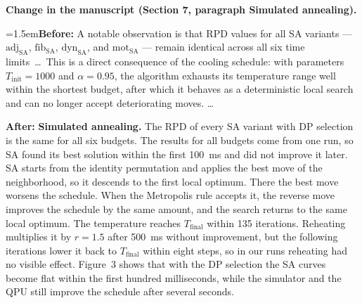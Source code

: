 \documentclass[12pt]{article}
\newcommand{\change}[3]{\par\smallskip\noindent\textbf{Change in the manuscript (#1).}\par
  {\leftskip=1.5em\noindent\textbf{Before:} #2\par\noindent\textbf{After:} #3\par}}
\begin{document}
\change{Section 7, paragraph Simulated annealing}{A notable observation is that RPD values for all SA variants --- $\mathrm{adj}_{\mathrm{SA}}$, $\mathrm{fib}_{\mathrm{SA}}$, $\mathrm{dyn}_{\mathrm{SA}}$, and $\mathrm{mot}_{\mathrm{SA}}$ --- remain identical across all six time limits~\dots\ This is a direct consequence of the cooling schedule: with parameters $T_{\mathrm{init}}=1000$ and $\alpha=0.95$, the algorithm exhausts its temperature range well within the shortest budget, after which it behaves as a deterministic local search and can no longer accept deteriorating moves. \dots}{\textbf{Simulated annealing.} The RPD of every SA variant with DP selection is the same for all six budgets. The results for all budgets come from one run, so SA found its best solution within the first 100~ms and did not improve it later. SA starts from the identity permutation and applies the best move of the neighborhood, so it descends to the first local optimum. There the best move worsens the schedule. When the Metropolis rule accepts it, the reverse move improves the schedule by the same amount, and the search returns to the same local optimum. The temperature reaches $T_{\text{final}}$ within 135 iterations. Reheating multiplies it by $r=1.5$ after 500~ms without improvement, but the following iterations lower it back to $T_{\text{final}}$ within eight steps, so in our runs reheating had no visible effect. Figure~3 shows that with the DP selection the SA curves become flat within the first hundred milliseconds, while the simulator and the QPU still improve the schedule after several seconds.}
\end{document}
